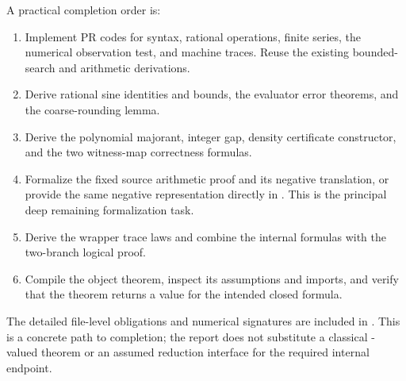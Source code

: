 A practical completion order is:
\begin{enumerate}
\item Implement PR codes for syntax, rational operations, finite series,
the numerical observation test, and machine traces. Reuse the existing
bounded-search and arithmetic derivations.
\item Derive rational sine identities and bounds, the evaluator error
theorems, and the coarse-rounding lemma.
\item Derive the polynomial majorant, integer gap, density certificate
constructor, and the two witness-map correctness formulas.
\item Formalize the fixed source arithmetic proof and its negative
translation, or provide the same negative representation directly in
. This is the principal deep remaining formalization task.
\item Derive the wrapper trace laws and combine the internal formulas
with the two-branch logical proof.
\item Compile the object theorem, inspect its assumptions and imports,
and verify that the theorem returns a  value for the
intended closed formula.
\end{enumerate}

The detailed file-level obligations and numerical signatures are included
in . This is a concrete path to completion;
the report does not substitute a classical -valued theorem or
an assumed reduction interface for the required internal endpoint.
